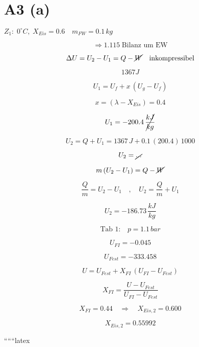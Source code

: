 \section*{A3 (a)}

$Z_1: \; 0^\circ C, \; X_{Eis} = 0.6 \quad m_{FW} = 0.1 \, kg$

\[
\Rightarrow 1.115 \; \text{Bilanz um EW}
\]

\[
\Delta U = U_2 - U_1 = Q - \cancel{W} \quad \text{inkompressibel}
\]

\[
1367 J
\]

\[
U_1 = U_f + x \, (U_g - U_f)
\]

\[
x = (\lambda - X_{Eis}) = 0.4
\]

\[
U_1 = -200.4 \, \cancel{\frac{kJ}{kg}}
\]

\[
U_2 = Q + U_1 = 1367 \, J + 0.1 \, (200.4) \, 1000
\]

\[
U_2 = \cancel{\text{...}}
\]

\[
m \, (U_2 - U_1) = Q - \cancel{W}
\]

\[
\frac{Q}{m} = U_2 - U_1 \quad , \quad U_2 = \frac{Q}{m} + U_1
\]

\[
U_2 = -186.73 \, \frac{kJ}{kg}
\]

\[
\text{Tab 1:} \quad p = 1.1 \, bar
\]

\[
U_{FI} = -0.045
\]

\[
U_{Fest} = -333.458
\]

\[
U = U_{Fest} + X_{FI} \, (U_{FI} - U_{Fest})
\]

\[
X_{FI} = \frac{U - U_{Fest}}{U_{FI} - U_{Fest}}
\]

\[
X_{FI} = 0.44 \quad \Rightarrow \quad X_{Eis,2} = 0.600
\]

\[
X_{Eis,2} = 0.55992
\]

``````latex


